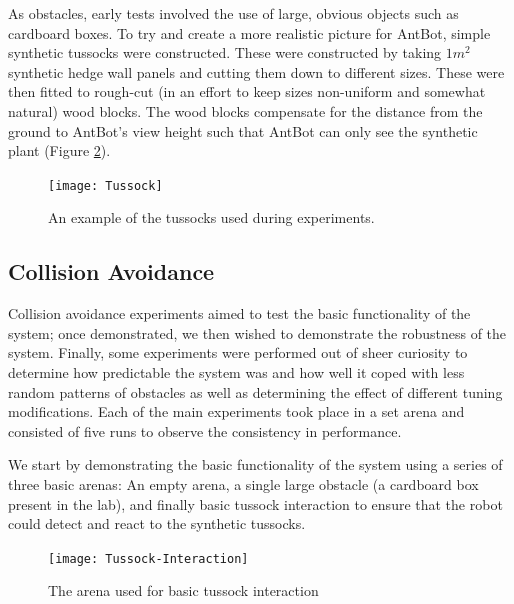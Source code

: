 \documentclass[a4paper,12pt]{article}
\begin{document}
As obstacles, early tests involved the use of large, obvious objects such as cardboard boxes. To try and create a more realistic
picture for AntBot, simple synthetic tussocks were constructed. These were constructed by taking $1m^2$ synthetic hedge wall panels and
cutting them down to different sizes. These were then fitted to rough-cut (in an effort to keep sizes non-uniform and somewhat
natural) wood blocks. The wood blocks compensate for the distance from the ground to AntBot's view height such that AntBot can only
see the synthetic plant (Figure \ref{fig:tussock}).
\newline

\begin{figure}[h]
  \centering
  \texttt{[image: Tussock]}
  \caption{
    \label{fig:tussock} An example of the tussocks used during experiments.
  }
\end{figure}

\subsection{Collision Avoidance}
Collision avoidance experiments aimed to test the basic functionality of the system; once demonstrated, we then wished to demonstrate
the robustness of the system. Finally, some experiments were performed out of sheer curiosity to determine how predictable the
system was and how well it coped with less random patterns of obstacles as well as determining the effect of different tuning modifications.
Each of the main experiments took place in a set arena and consisted of five runs to observe the consistency in performance. 
\newline

We start by demonstrating the basic functionality of the system using a series of three basic arenas: An empty arena, a single large obstacle
(a cardboard box present in the lab), and finally basic tussock interaction to ensure that the robot could detect and react to the synthetic
tussocks.

\begin{figure}[h]
  \centering
  \texttt{[image: Tussock-Interaction]}
  \caption{
    \label{fig:tussock} The arena used for basic tussock interaction
  }
\end{figure}
\end{document}
